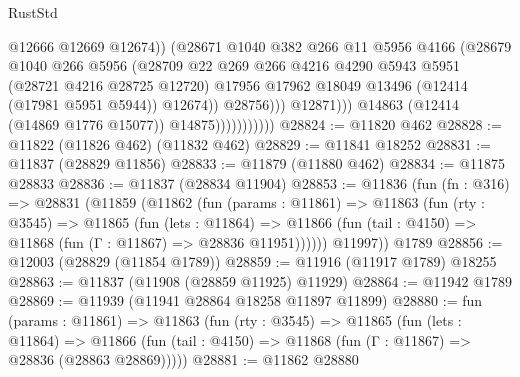 \begin{lexlean}{RustStd}
\begin{coremodule}
                                        @12666
                                        @12669
                                        @12674))
                                    (@28671
                                      @1040
                                      @382
                                      @266
                                      @11
                                      @5956
                                      @4166
                                      (@28679
                                        @1040
                                        @266
                                        @5956
                                        (@28709
                                          @22
                                          @269
                                          @266
                                          @4216
                                          @4290
                                          @5943
                                          @5951
                                          (@28721 @4216 @28725 @12720)
                                          @17956
                                          @17962
                                          @18049
                                          @13496
                                          (@12414 (@17981 @5951 @5944))
                                          @12674))
                                      @28756)))
                                @12871)))
                          @14863
                          (@12414 (@14869 @1776 @15077))
                          @14875)))))))))))
@28824 := @11820 @462
@28828 := @11822 (@11826 @462) (@11832 @462)
@28829 := @11841 @18252
@28831 := @11837 (@28829 @11856)
@28833 := @11879 (@11880 @462)
@28834 := @11875 @28833
@28836 := @11837 (@28834 @11904)
@28853 := @11836
    (fun (fn : @316) =>
    @28831
      (@11859
        (@11862
          (fun (params : @11861) =>
          @11863
            (fun (rty : @3545) =>
            @11865
              (fun (lets : @11864) =>
              @11866 (fun (tail : @4150) => @11868 (fun (Γ : @11867) => @28836 @11951))))))
        @11997))
    @1789
@28856 := @12003 (@28829 (@11854 @1789))
@28859 := @11916 (@11917 @1789) @18255
@28863 := @11837 (@11908 (@28859 @11925) @11929)
@28864 := @11942 @1789
@28869 := @11939 (@11941 @28864 @18258 @11897 @11899)
@28880 := fun (params : @11861) =>
  @11863
    (fun (rty : @3545) =>
    @11865
      (fun (lets : @11864) =>
      @11866 (fun (tail : @4150) => @11868 (fun (Γ : @11867) => @28836 (@28863 @28869)))))
@28881 := @11862 @28880

\end{coremodule}
\end{lexlean}
